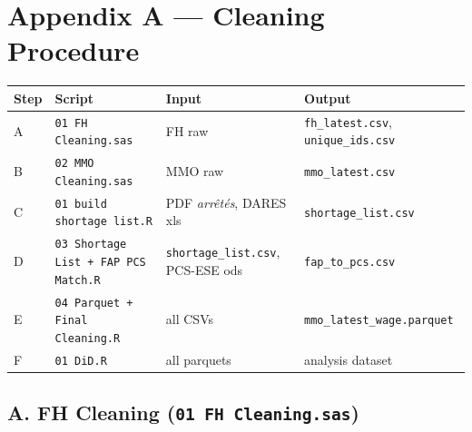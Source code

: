 
\section*{Appendix A — Cleaning Procedure}

\begin{center}
\small
\begin{tabular}{llll}
\toprule
Step & Script & Input & Output \\
\midrule
A & \texttt{01 FH Cleaning.sas}             & FH raw           & \texttt{fh\_latest.csv}, \texttt{unique\_ids.csv} \\
B & \texttt{02 MMO Cleaning.sas}            & MMO raw          & \texttt{mmo\_latest.csv} \\
C & \texttt{01 build shortage list.R}       & PDF \textit{arrêtés}, DARES xls & \texttt{shortage\_list.csv} \\
D & \texttt{03 Shortage List + FAP PCS Match.R} & \texttt{shortage\_list.csv}, PCS-ESE ods & \texttt{fap\_to\_pcs.csv} \\
E & \texttt{04 Parquet + Final Cleaning.R}  & all CSVs         & \texttt{mmo\_latest\_wage.parquet} \\
F & \texttt{01 DiD.R}                       & all parquets     & analysis dataset \\
\bottomrule
\end{tabular}
\end{center}

\subsection*{A. FH Cleaning \textnormal{\small(\texttt{01 FH Cleaning.sas})}}

